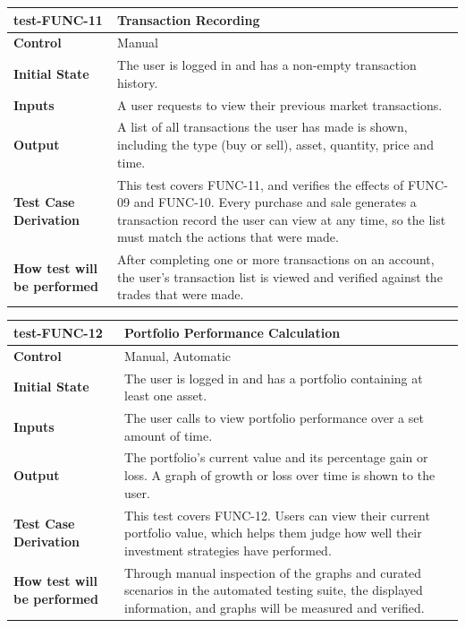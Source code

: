 \documentclass[12pt, titlepage]{article}
\begin{document}
\vspace{1em}

\noindent\begin{tabularx}{\textwidth}{>{\raggedright\arraybackslash}p{3.5cm}X}
  \toprule
  \textbf{test-FUNC-11} & \textbf{Transaction Recording}\\
  \midrule
  \textbf{Control} & Manual\\
  \textbf{Initial State} & The user is logged in and has a non-empty transaction history.\\
  \textbf{Inputs} & A user requests to view their previous market transactions.\\
  \textbf{Output} & A list of all transactions the user has made is shown, including the type (buy or sell), asset, quantity, price and time.\\
  \textbf{Test Case Derivation} & This test covers FUNC-11, and verifies the effects of FUNC-09 and FUNC-10. Every purchase and sale generates a transaction record the user can view at any time, so the list must match the actions that were made.\\
  \textbf{How test will be performed} & After completing one or more transactions on an account, the user's transaction list is viewed and verified against the trades that were made.\\
  \bottomrule
\end{tabularx}

\vspace{1em}

\noindent\begin{tabularx}{\textwidth}{>{\raggedright\arraybackslash}p{3.5cm}X}
  \toprule
  \textbf{test-FUNC-12} & \textbf{Portfolio Performance Calculation}\\
  \midrule
  \textbf{Control} & Manual, Automatic\\
  \textbf{Initial State} & The user is logged in and has a portfolio containing at least one asset.\\
  \textbf{Inputs} & The user calls to view portfolio performance over a set amount of time.\\
  \textbf{Output} & The portfolio's current value and its percentage gain or loss. A graph of growth or loss over time is shown to the user.\\
  \textbf{Test Case Derivation} & This test covers FUNC-12. Users can view their current portfolio value, which helps them judge how well their investment strategies have performed.\\
  \textbf{How test will be performed} & Through manual inspection of the graphs and curated scenarios in the automated testing suite, the displayed information, and graphs will be measured and verified.\\
  \bottomrule
\end{tabularx}
\end{document}
